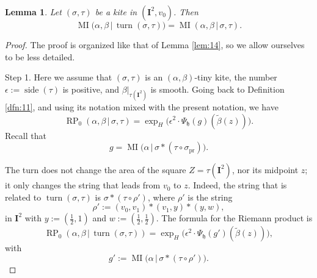 \documentclass[10pt, a4paper]{amsart}
\newtheorem{lem}[equation]{Lemma}
\theoremstyle{definition}
\numberwithin{equation}{section}
\newcommand{\opn}{\operatorname}
\newcommand{\mfrak}[1]{\mathfrak{#1}}
\newcommand{\mbf}[1]{\mathbf{#1}}
\newcommand{\mrm}[1]{\mathrm{#1}}
\newcommand{\smfrac}[2]{{\textstyle \frac{#1}{#2}}}
\newcommand{\til}[1]{\tilde{#1}}
\renewcommand{\vert}{\, | \,}
\newcommand{\h}{\mfrak{h}}
\begin{document}
\begin{lem} \label{lem:16}
Let $(\sigma, \tau)$ be a kite in $(\mbf{I}^2, v_0)$. 
Then
\begin{equation} \label{eqn:190}
\opn{MI} \bigl( \alpha, \beta \vert \opn{turn}(\sigma, \tau) \bigr) =
\opn{MI} (\alpha, \beta \vert \sigma, \tau) .
\end{equation}
\end{lem}

\begin{proof}
The proof is organized like that of Lemma \ref{lem:14}, so we allow ourselves
to be less detailed.

\medskip \noindent
Step 1. Here we assume that $(\sigma, \tau)$ is an $(\alpha, \beta)$-tiny kite,
the number $\epsilon := \opn{side}(\tau)$ is positive, and 
$\beta|_{\tau(\mbf{I}^2)}$ is smooth. Going back to Definition \ref{dfn:11},
and using its notation mixed with the present notation, we have
\[ \opn{RP}_0(\alpha, \beta \vert \sigma, \tau) = 
\exp_H \bigl( \epsilon^2 \cdot \Psi_{\h}(g)(\til{\beta}(z)) \bigr) . \]
Recall that 
\[ g = \opn{MI} \bigl( \alpha \vert \sigma * (\tau \circ \sigma_{\mrm{pr}})
\bigr) . \]

The turn does not change the area of the square 
$Z = \tau(\mbf{I}^2)$, nor its midpoint $z$; it only changes the string that
leads from $v_0$ to $z$. Indeed, the string that is related to 
$\opn{turn}(\sigma, \tau)$ is $\sigma * (\tau \circ \rho')$, 
where $\rho'$ is the string
\[ \rho' := (v_0, v_1) * (v_1, y) * (y, w) , \]
in $\mbf{I}^2$ with  
$y := (\smfrac{1}{2}, 1)$ and $w := (\smfrac{1}{2}, \smfrac{1}{2})$.
The formula for the Riemann product is
\[ \opn{RP}_0(\alpha, \beta \vert \opn{turn}(\sigma, \tau)) = 
\exp_H \bigl( \epsilon^2 \cdot \Psi_{\h}(g')(\til{\beta}(z)) \bigr) , \]
with 
\[ g' := \opn{MI} \bigl( \alpha \vert \sigma * (\tau \circ \rho') \bigr) . \]


\end{proof}
\end{document}
